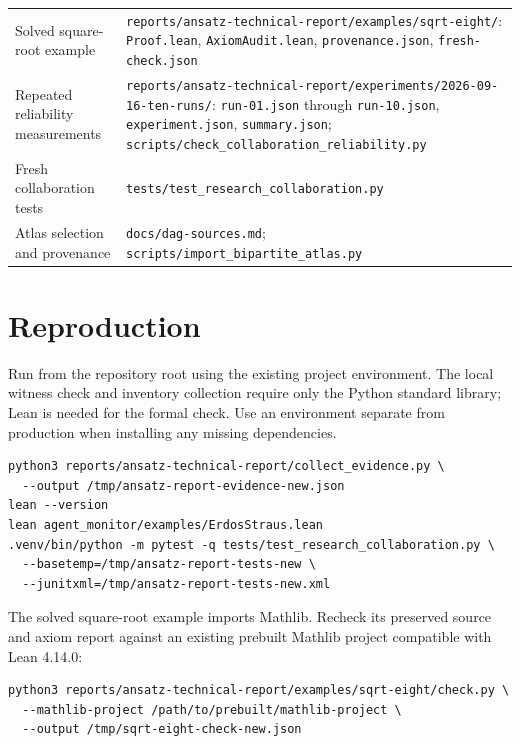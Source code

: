 \documentclass[10pt,letterpaper]{article}
\begin{document}
\begin{longtable}{>{\raggedright\arraybackslash}p{0.31\dimexpr\linewidth-4\tabcolsep\relax}>{\raggedright\arraybackslash}p{0.69\dimexpr\linewidth-4\tabcolsep\relax}}
Solved square-root example & \nolinkurl{reports/ansatz-technical-report/examples/sqrt-eight/}: \nolinkurl{Proof.lean}, \nolinkurl{AxiomAudit.lean}, \nolinkurl{provenance.json}, \nolinkurl{fresh-check.json} \\
Repeated reliability measurements & \nolinkurl{reports/ansatz-technical-report/experiments/2026-09-16-ten-runs/}: \nolinkurl{run-01.json} through \nolinkurl{run-10.json}, \nolinkurl{experiment.json}, \nolinkurl{summary.json}; \nolinkurl{scripts/check_collaboration_reliability.py} \\
Fresh collaboration tests & \nolinkurl{tests/test_research_collaboration.py} \\
Atlas selection and provenance & \nolinkurl{docs/dag-sources.md}; \nolinkurl{scripts/import_bipartite_atlas.py} \\
\end{longtable}
\endgroup

\clearpage

\section{Reproduction}

Run from the repository root using the existing project environment. The local witness check and inventory collection require only the Python standard library; Lean is needed for the formal check. Use an environment separate from production when installing any missing dependencies.

\begin{lstlisting}
python3 reports/ansatz-technical-report/collect_evidence.py \
  --output /tmp/ansatz-report-evidence-new.json
lean --version
lean agent_monitor/examples/ErdosStraus.lean
.venv/bin/python -m pytest -q tests/test_research_collaboration.py \
  --basetemp=/tmp/ansatz-report-tests-new \
  --junitxml=/tmp/ansatz-report-tests-new.xml
\end{lstlisting}


The solved square-root example imports Mathlib. Recheck its preserved source and axiom report against an existing prebuilt Mathlib project compatible with Lean 4.14.0:

\begin{lstlisting}
python3 reports/ansatz-technical-report/examples/sqrt-eight/check.py \
  --mathlib-project /path/to/prebuilt/mathlib-project \
  --output /tmp/sqrt-eight-check-new.json
\end{lstlisting}
\end{document}
